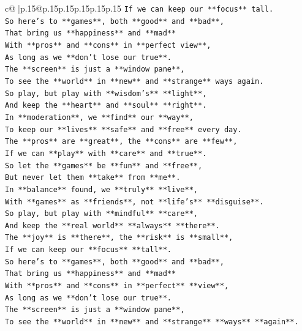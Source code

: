 \documentclass{article}
\begin{document}
{\begin{supertabular}{c@{$\;$}|p{.15\linewidth}@{}p{.15\linewidth}p{.15\linewidth}p{.15\linewidth}p{.15\linewidth}p{.15\linewidth}}
{{{\texttt{If we can keep our **focus** tall.} \\
\texttt{So here's to **games**, both **good** and **bad**,} \\
\texttt{That bring us **happiness** and **mad**} \\
\texttt{With **pros** and **cons** in **perfect view**,} \\
\texttt{As long as we **don't lose our true**.} \\
\texttt{The **screen** is just a **window pane**,} \\
\texttt{To see the **world** in **new** and **strange** ways again.} \\
\texttt{So play, but play with **wisdom's** **light**,} \\
\texttt{And keep the **heart** and **soul** **right**.} \\
\texttt{In **moderation**, we **find** our **way**,} \\
\texttt{To keep our **lives** **safe** and **free** every day.} \\
\texttt{The **pros** are **great**, the **cons** are **few**,} \\
\texttt{If we can **play** with **care** and **true**.} \\
\texttt{So let the **games** be **fun** and **free**,} \\
\texttt{But never let them **take** from **me**.} \\
\texttt{In **balance** found, we **truly** **live**,} \\
\texttt{With **games** as **friends**, not **life's** **disguise**.} \\
\texttt{So play, but play with **mindful** **care**,} \\
\texttt{And keep the **real world** **always** **there**.} \\
\texttt{The **joy** is **there**, the **risk** is **small**,} \\
\texttt{If we can keep our **focus** **tall**.} \\
\texttt{So here's to **games**, both **good** and **bad**,} \\
\texttt{That bring us **happiness** and **mad**} \\
\texttt{With **pros** and **cons** in **perfect** **view**,} \\
\texttt{As long as we **don't lose our true**.} \\
\texttt{The **screen** is just a **window pane**,} \\
\texttt{To see the **world** in **new** and **strange** **ways** **again**.} \\
}}}
\end{supertabular}}
\end{document}

